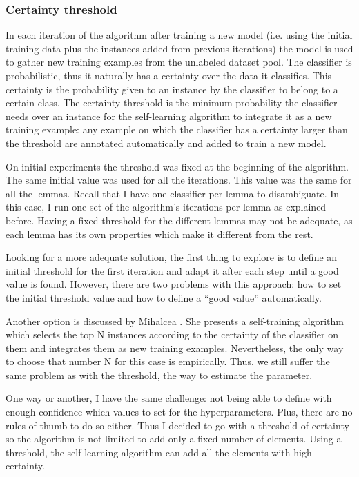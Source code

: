 \subsubsection{Certainty threshold}

In each iteration of the algorithm after training a new model (i.e. using the
initial training data plus the instances added from previous iterations) the
model is used to gather new training examples from the unlabeled dataset pool.
The classifier is probabilistic, thus it naturally has a certainty over the
data it classifies. This certainty is the probability given to an instance by
the classifier to belong to a certain class. The certainty threshold is the
minimum probability the classifier needs over an instance for the self-learning
algorithm to integrate it as a new training example: any example on which the
classifier has a certainty larger than the threshold are annotated
automatically and added to train a new model. 

On initial experiments the threshold was fixed at the beginning of the
algorithm. The same initial value was used for all the iterations. This value
was the same for all the lemmas. Recall that I have one classifier per lemma to
disambiguate. In this case, I run one set of the algorithm's iterations per
lemma as explained before. Having a fixed threshold for the different lemmas
may not be adequate, as each lemma has its own properties which make it
different from the rest.

Looking for a more adequate solution, the first thing to explore is to define
an initial threshold for the first iteration and adapt it after each step until
a good value is found. However, there are two problems with this approach: how
to set the initial threshold value and how to define a ``good value''
automatically.

Another option is discussed by Mihalcea \cite{mihalcea:2004:CONLL}. She
presents a self-training algorithm which selects the top N instances according
to the certainty of the classifier on them and integrates them as new training
examples. Nevertheless, the only way to choose that number N for this case is
empirically. Thus, we still suffer the same problem as with the threshold, the
way to estimate the parameter.

One way or another, I have the same challenge: not being able to define with
enough confidence which values to set for the hyperparameters. Plus, there are
no rules of thumb to do so either. Thus I decided to go with a threshold of
certainty so the algorithm is not limited to add only a fixed number of
elements. Using a threshold, the self-learning algorithm can add all the
elements with high certainty.

